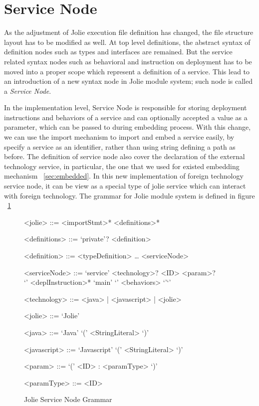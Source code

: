 
\section{Service Node}

As the adjustment of Jolie execution file definition has changed, the file structure layout has to be modified as well.  At top level definitions, the abstract syntax of definition nodes such as types and interfaces are remained. But the service related syntax nodes such as behavioral and instruction on deployment has to be moved into a proper scope which represent a definition of a service. This lead to an introduction of a new syntax node in Jolie module system; such node is called a \textit{Service Node}.

In the implementation level, Service Node is responsible for storing deployment instructions and behaviors of a service and can optionally accepted a value as a parameter, which can be passed to during embedding process.
With this change, we can use the import mechanism to import and embed a service easily, by specify a service as an identifier, rather than using string defining a path as before.
The definition of service node also cover the declaration of the external technology service, in particular, the one that we used for existed embedding mechanism ~\ref{sec:embedded}.
In this new implementation of foreign technology service node, it can be view as a special type of jolie service which can interact with foreign technology.
The grammar for Jolie module system is defined in figure ~\ref{fig:jolie-servicenode-grammar}

\begin{figure}[h]
    \begin{framed}
        \begin{grammar}
            <jolie> ::= <importStmt>* <definitions>*

            <definitions> ::= `private'? <definition>

            <definition> ::=  <typeDefinition>
            \dots
            \alt <serviceNode>

            <serviceNode> ::= `service' <technology>? <ID> <param>? \\ `{' <deplInstruction>* `main' `{' <behaviors> `}'`}'

            <technology> ::= <java> | <javascript> | <jolie>

            <jolie> ::= `Jolie'

            <java> ::= `Java' `(' <StringLiteral> `)'

            <javascript> ::= `Javascript' `(' <StringLiteral> `)'

            <param> ::= `(' <ID> : <paramType> `)'

            <paramType> ::= <ID>
        \end{grammar}
    \end{framed}
    \caption{Jolie Service Node Grammar}
    \label{fig:jolie-servicenode-grammar}
\end{figure}

